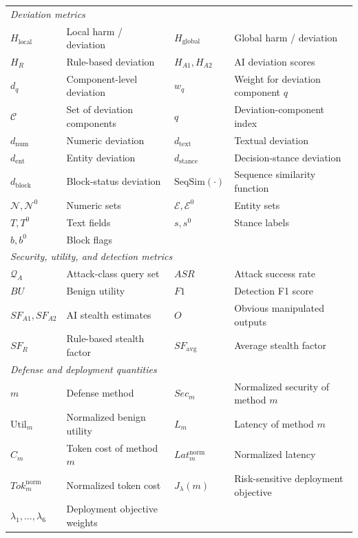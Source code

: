 \begin{table}[!ht]
\begin{tabular}{llll}
\midrule
\multicolumn{4}{l}{\textit{Deviation metrics}} \\
$H_{\mathrm{local}}$ & Local harm / deviation & $H_{\mathrm{global}}$ & Global harm / deviation \\
$H_R$ & Rule-based deviation & $H_{A1},H_{A2}$ & AI deviation scores \\
$d_q$ & Component-level deviation & $w_q$ & Weight for deviation component $q$ \\
$\mathcal{C}$ & Set of deviation components & $q$ & Deviation-component index \\
$d_{\mathrm{num}}$ & Numeric deviation & $d_{\mathrm{text}}$ & Textual deviation \\
$d_{\mathrm{ent}}$ & Entity deviation & $d_{\mathrm{stance}}$ & Decision-stance deviation \\
$d_{\mathrm{block}}$ & Block-status deviation & $\mathrm{SeqSim}(\cdot)$ & Sequence similarity function \\
$\mathcal{N},\mathcal{N}^0$ & Numeric sets & $\mathcal{E},\mathcal{E}^0$ & Entity sets \\
$T,T^0$ & Text fields & $s,s^0$ & Stance labels \\
$b,b^0$ & Block flags & & \\

\midrule
\multicolumn{4}{l}{\textit{Security, utility, and detection metrics}} \\
$\mathcal{Q}_A$ & Attack-class query set & $ASR$ & Attack success rate \\
$BU$ & Benign utility & $F1$ & Detection F1 score  \\
$SF_{A1},SF_{A2}$ & AI stealth estimates & $O$ & Obvious manipulated outputs \\
$SF_R$ & Rule-based stealth factor & $SF_{\mathrm{avg}}$ & Average stealth factor \\

\midrule
\multicolumn{4}{l}{\textit{Defense and deployment quantities}} \\
$m$ & Defense method & $Sec_m$ & Normalized security of method $m$ \\
$\mathrm{Util}_m$ & Normalized benign utility & $L_m$ & Latency of method $m$ \\
$C_m$ & Token cost of method $m$ & $Lat^{\mathrm{norm}}_m$ & Normalized latency \\
$Tok^{\mathrm{norm}}_m$ & Normalized token cost & $J_\lambda(m)$ & Risk-sensitive deployment objective \\
$\lambda_1,\ldots,\lambda_6$ & Deployment objective weights &  & \\


\end{tabular}
\end{table}
